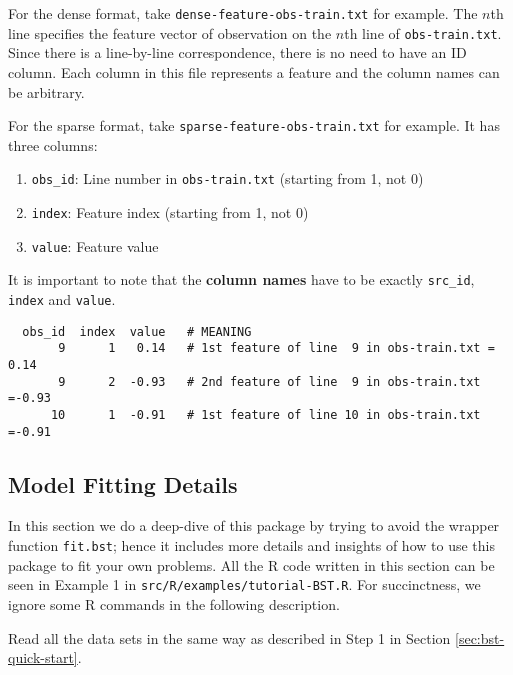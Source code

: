 \documentclass[10pt]{article}
\newcommand{\parahead}[1]{\vspace{0.15in}\noindent{\bf #1:}}
\begin{document}
For the dense format, take {\tt dense-feature-obs-train.txt} for example.  The $n$th line specifies the feature vector of observation on the $n$th line of {\tt obs-train.txt}.  Since there is a line-by-line correspondence, there is no need to have an ID column.  Each column in this file represents a feature and the column names can be arbitrary.

For the sparse format, take {\tt sparse-feature-obs-train.txt} for example.  It has three columns:
\begin{enumerate}
\item {\tt obs\_id}: Line number in {\tt obs-train.txt} (starting from 1, not 0)
\item {\tt index}: Feature index (starting from 1, not 0)
\item {\tt value}: Feature value
\end{enumerate}
It is important to note that the {\bf column names} have to be exactly {\tt src\_id}, {\tt index} and {\tt value}.
{\small\begin{verbatim}
  obs_id  index  value   # MEANING
       9      1   0.14   # 1st feature of line  9 in obs-train.txt = 0.14
       9      2  -0.93   # 2nd feature of line  9 in obs-train.txt =-0.93
      10      1  -0.91   # 1st feature of line 10 in obs-train.txt =-0.91
\end{verbatim}}



\subsection{Model Fitting Details}
\label{sec:fitting}
In this section we do a deep-dive of this package by trying to avoid the wrapper function {\tt fit.bst}; hence it includes more details and insights of how to use this package to fit your own problems. All the R code written in this section can be 
seen in Example 1 in {\tt src/R/examples/tutorial-BST.R}.  For succinctness, we ignore some R commands in the following description.

\parahead{Step 1} Read all the data sets in the same way as described in Step 1 in Section \ref{sec:bst-quick-start}.
\end{document}
